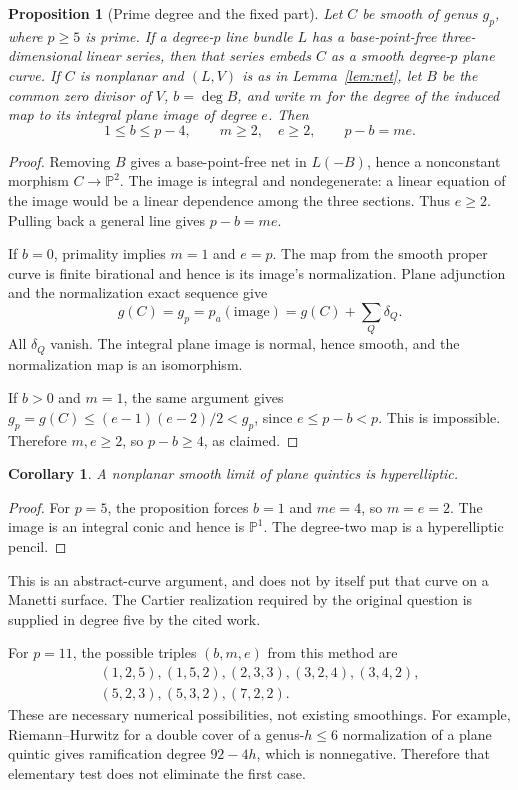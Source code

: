 \documentclass[11pt]{article}
\newtheorem{proposition}[theorem]{Proposition}
\newtheorem{corollary}[theorem]{Corollary}
\theoremstyle{remark}\newtheorem{remark}[theorem]{Remark}
\newcommand{\PP}{\mathbb P}\newcommand{\CC}{\mathbb C}\newcommand{\ZZ}{\mathbb Z}
\begin{document}
\begin{proposition}[Prime degree and the fixed part]\label{prop:basepoints}
Let $C$ be smooth of genus $g_p$, where $p\geq5$ is prime. If a degree-$p$ line bundle $L$ has a base-point-free three-dimensional linear series, then that series embeds $C$ as a smooth degree-$p$ plane curve.
If $C$ is nonplanar and $(L,V)$ is as in Lemma~\ref{lem:net}, let $B$ be the common zero divisor of $V$, $b=\deg B$, and write $m$ for the degree of the induced map to its integral plane image of degree $e$. Then
\[
 1\leq b\leq p-4,\qquad m\geq2,\quad e\geq2,
 \qquad p-b=me.
\]
\end{proposition}
\begin{proof}
Removing $B$ gives a base-point-free net in $L(-B)$, hence a nonconstant morphism $C\to\PP^2$. The image is integral and nondegenerate: a linear equation of the image would be a linear dependence among the three sections. Thus $e\geq2$. Pulling back a general line gives $p-b=me$.

If $b=0$, primality implies $m=1$ and $e=p$. The map from the smooth proper curve is finite birational and hence is its image's normalization. Plane adjunction and the normalization exact sequence give
\[
 g(C)=g_p=p_a(\text{image})=g(C)+\sum_Q\delta_Q.
\]
All $\delta_Q$ vanish. The integral plane image is normal, hence smooth, and the normalization map is an isomorphism.

If $b>0$ and $m=1$, the same argument gives
$g_p=g(C)\leq(e-1)(e-2)/2<g_p$, since $e\leq p-b<p$. This is impossible. Therefore $m,e\geq2$, so $p-b\geq4$, as claimed.
\end{proof}

\begin{corollary}
A nonplanar smooth limit of plane quintics is hyperelliptic.
\end{corollary}
\begin{proof}
For $p=5$, the proposition forces $b=1$ and $me=4$, so $m=e=2$. The image is an integral conic and hence is $\PP^1$. The degree-two map is a hyperelliptic pencil.
\end{proof}
This is an abstract-curve argument, and does not by itself put that curve on a Manetti surface. The Cartier realization required by the original question is supplied in degree five by the cited work.

For $p=11$, the possible triples $(b,m,e)$ from this method are
\[
\begin{gathered}
(1,2,5),(1,5,2),(2,3,3),(3,2,4),(3,4,2),\\
(5,2,3),(5,3,2),(7,2,2).
\end{gathered}
\]
These are necessary numerical possibilities, not existing smoothings. For example, Riemann--Hurwitz for a double cover of a genus-$h\leq6$ normalization of a plane quintic gives ramification degree $92-4h$, which is nonnegative. Therefore that elementary test does not eliminate the first case.
\end{document}
